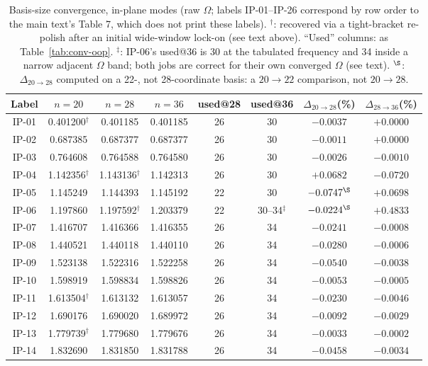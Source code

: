 \documentclass[11pt]{article}
\begin{document}
\begin{table}[!t]\centering\scriptsize
\setlength{\tabcolsep}{4pt}
\renewcommand{\arraystretch}{0.95}
\caption{Basis-size convergence, in-plane modes (raw $\Omega$; labels
IP-01--IP-26 correspond by row order to the main text's Table 7, which
does not print these labels). $^\dagger$: recovered via a
tight-bracket re-polish after an initial wide-window lock-on (see text
above). ``Used'' columns: as Table~\ref{tab:conv-oop}. $^\ddagger$: IP-06's
used@36 is 30 at the tabulated frequency and 34 inside a narrow adjacent
$\Omega$ band; both jobs are correct for their own converged $\Omega$
(see text). $^{\S}$:
$\Delta_{20\to28}$ computed on a 22-, not 28-coordinate basis: a
$20\to22$ comparison, not $20\to28$.}
\label{tab:conv-ip}
\begin{tabular}{cccccccc}
\toprule Label & $n{=}20$ & $n{=}28$ & $n{=}36$ & used@28 & used@36 & $\Delta_{20\to28}$(\%) & $\Delta_{28\to36}$(\%)\\ \midrule
IP-01 & 0.401200$^\dagger$ & 0.401185 & 0.401185 & 26 & 30 & $-0.0037$ & $+0.0000$\\
IP-02 & 0.687385 & 0.687377 & 0.687377 & 26 & 30 & $-0.0011$ & $+0.0000$\\
IP-03 & 0.764608 & 0.764588 & 0.764580 & 26 & 30 & $-0.0026$ & $-0.0010$\\
IP-04 & 1.142356$^\dagger$ & 1.143136$^\dagger$ & 1.142313 & 26 & 30 & $+0.0682$ & $-0.0720$\\
IP-05 & 1.145249 & 1.144393 & 1.145192 & 22 & 30 & $-0.0747^{\S}$ & $+0.0698$\\
IP-06 & 1.197860 & 1.197592$^\dagger$ & 1.203379 & 22 & 30--34$^\ddagger$ & $-0.0224^{\S}$ & $+0.4833$\\
IP-07 & 1.416707 & 1.416366 & 1.416355 & 26 & 34 & $-0.0241$ & $-0.0008$\\
IP-08 & 1.440521 & 1.440118 & 1.440110 & 26 & 34 & $-0.0280$ & $-0.0006$\\
IP-09 & 1.523138 & 1.522316 & 1.522258 & 26 & 34 & $-0.0540$ & $-0.0038$\\
IP-10 & 1.598919 & 1.598834 & 1.598826 & 26 & 34 & $-0.0053$ & $-0.0005$\\
IP-11 & 1.613504$^\dagger$ & 1.613132 & 1.613057 & 26 & 34 & $-0.0230$ & $-0.0046$\\
IP-12 & 1.690176 & 1.690020 & 1.689972 & 26 & 34 & $-0.0092$ & $-0.0029$\\
IP-13 & 1.779739$^\dagger$ & 1.779680 & 1.779676 & 26 & 34 & $-0.0033$ & $-0.0002$\\
IP-14 & 1.832690 & 1.831850 & 1.831788 & 26 & 34 & $-0.0458$ & $-0.0034$\\

\end{tabular}
\end{table}
\end{document}
